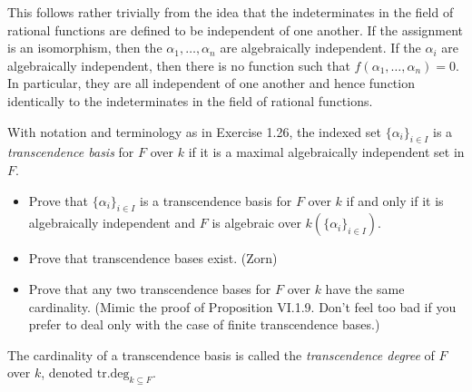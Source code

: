 \documentclass[../../master.tex]{subfiles}
\begin{document}
\begin{solution}
    This follows rather trivially from the idea that the indeterminates in the field of rational functions are defined to be independent of one another.
    If the assignment is an isomorphism, then the $\alpha_1, \ldots, \alpha_n$ are algebraically independent.
    If the $\alpha_i$ are algebraically independent, then there is no function such that $f(\alpha_1, \ldots, \alpha_n) = 0$.
    In particular, they are all independent of one another and hence function identically to the indeterminates in the field of rational functions.
\end{solution}

\begin{problem}
    With notation and terminology as in Exercise 1.26, the indexed set $\{\alpha_i\}_{i \in I}$ is a \textit{transcendence basis} for $F$ over $k$ if it is a maximal algebraically independent set in $F$.
    \begin{itemize}
        \item Prove that $\{\alpha_i\}_{i \in I}$ is a transcendence basis for $F$ over $k$ if and only if it is algebraically independent and $F$ is algebraic over $k(\{\alpha_i\}_{i \in I})$.
        \item Prove that transcendence bases exist. (Zorn)
        \item Prove that any two transcendence bases for $F$ over $k$ have the same cardinality.
            (Mimic the proof of Proposition VI.1.9.
            Don't feel too bad if you prefer to deal only with the case of finite transcendence bases.)
    \end{itemize}
    The cardinality of a transcendence basis is called the \textit{transcendence degree} of $F$ over $k$, denoted $\text{tr.deg}_{k \subseteq F}$.
\end{problem}
\end{document}
